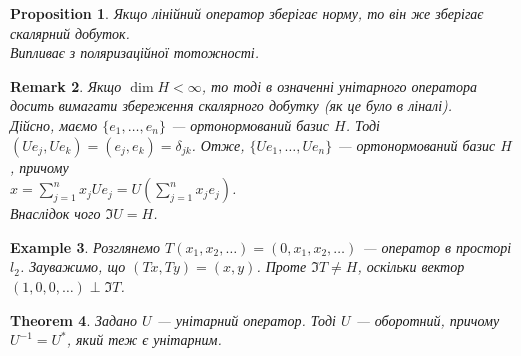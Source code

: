 \documentclass[a4paper, 10pt]{article}
\makeatletter
\theoremstyle{theoremdd}
\newtheorem{theorem}{Theorem}[subsection]
\theoremstyle{theoremdd}
\theoremstyle{theoremdd}
\theoremstyle{theoremdd}
\newtheorem{example}[theorem]{Example}
\theoremstyle{theoremdd}
\newtheorem{proposition}[theorem]{Proposition}
\theoremstyle{theoremdd}
\newtheorem{remark}[theorem]{Remark}
\theoremstyle{theoremdd}
\theoremstyle{theoremdd}
\renewenvironment{proof}[1][Proof.\\]{\par
\pushQED{\hfill \qed}%
\normalfont \topsep6\p@\@plus6\p@\relax
\trivlist
\item\relax
{\bfseries
#1\@addpunct{.}}\hspace\labelsep\ignorespaces
}{%
\popQED\endtrivlist\@endpefalse
}
\makeatother
\begin{document}
\begin{proposition}
Якщо лінійний оператор зберігає норму, то він же зберігає скалярний добуток.\\
\textit{Випливає з поляризаційної тотожності.}
\end{proposition}

\begin{remark}
Якщо $\dim H < \infty$, то тоді в означенні унітарного оператора досить вимагати збереження скалярного добутку (як це було в ліналі).\\
Дійсно, маємо $\{e_1,\dots,e_n\}$ --- ортонормований базис $H$. Тоді $(Ue_j,Ue_k) = (e_j,e_k) = \delta_{jk}$. Отже, $\{Ue_1,\dots,Ue_n\}$ --- ортонормований базис $H$, причому\\
$x = \displaystyle\sum_{j=1}^n x_j Ue_j = U\left( \sum_{j=1}^n x_j e_j\right)$.\\
Внаслідок чого $\Im U = H$.
\end{remark}

\begin{example}
Розглянемо $T(x_1,x_2,\dots) = (0,x_1,x_2,\dots)$ --- оператор в просторі $l_2$. Зауважимо, що $(Tx,Ty) = (x,y)$. Проте $\Im T \neq H$, оскільки вектор $(1,0,0,\dots) \perp \Im T$.
\end{example}

\begin{theorem}
Задано $U$ --- унітарний оператор. Тоді $U$ --- оборотний, причому $U^{-1} = U^*$, який теж є унітарним.
\end{theorem}
\end{document}
